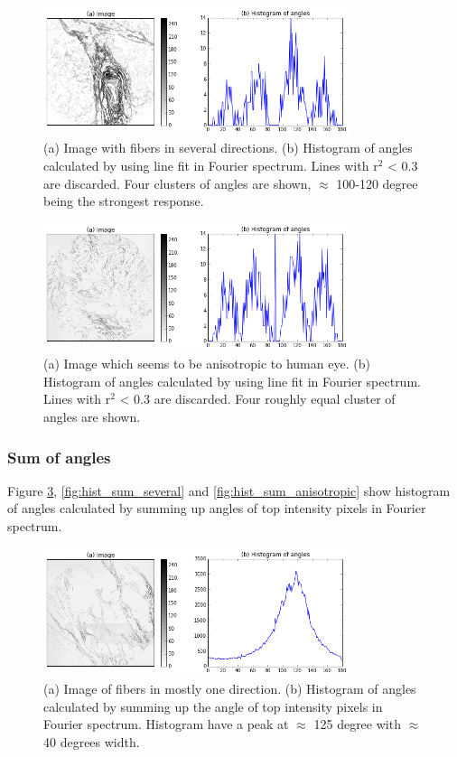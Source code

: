 \begin{figure}[h]
\centering
\includegraphics[width=0.8\textwidth]{hist_line_several3}
\caption{(a) Image with fibers in several directions. (b) Histogram of angles calculated by using line fit in Fourier spectrum. Lines with r$^2$ < 0.3 are discarded. Four clusters of angles are shown, $\approx$ 100-120 degree being the strongest response.}
\label{fig:hist_line_several3}
\end{figure}

\begin{figure}[h]
\centering
\includegraphics[width=0.8\textwidth]{hist_line_anisotropic3}
\caption{(a) Image which seems to be anisotropic to human eye. (b) Histogram of angles calculated by using line fit in Fourier spectrum. Lines with r$^2$ < 0.3 are discarded. Four roughly equal cluster of angles are shown.}
\label{fig:hist_line_anisotropic3}
\end{figure}


%
\subsubsection{Sum of angles}
Figure \ref{fig:hist_sum_one}, \ref{fig:hist_sum_several} and \ref{fig:hist_sum_anisotropic} show histogram of angles calculated by summing up angles of top intensity pixels in Fourier spectrum.

\begin{figure}[h]
\centering
\includegraphics[width=0.8\textwidth]{hist_sum_one}
\caption{(a) Image of fibers in mostly one direction. (b) Histogram of angles calculated by summing up the angle of top intensity pixels in Fourier spectrum. Histogram have a peak at $\approx$ 125 degree with $\approx$ 40 degrees width.}
\label{fig:hist_sum_one}
\end{figure}

